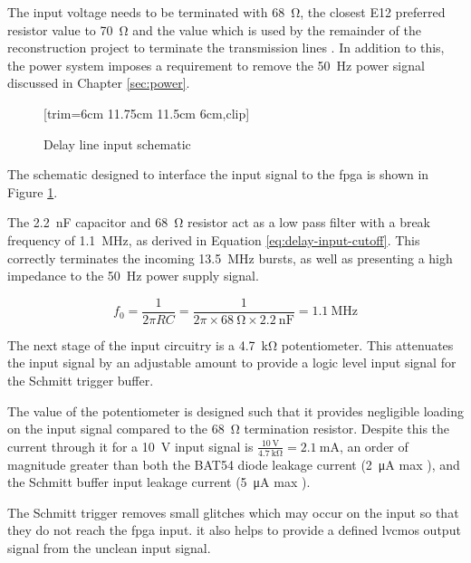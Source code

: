 The input voltage needs to be terminated with \SI{68}{\ohm}, the closest E12 preferred resistor value to \SI{70}{\ohm} and the value which is used by the remainder of the reconstruction project to terminate the transmission lines \cite{burton2014b}. In addition to this, the power system imposes a requirement to remove the \SI{50}{\hertz} power signal discussed in Chapter \ref{sec:power}.

\begin{figure}[ht]
	\centering
	[trim={6cm 11.75cm 11.5cm 6cm},clip] %
	\caption{Delay line input schematic}
	\label{fig:delay-line-input-sch}
\end{figure}

The schematic designed to interface the input signal to the \gls{fpga} is shown in Figure \ref{fig:delay-line-input-sch}.

The \SI{2.2}{\nano\farad} capacitor and \SI{68}{\ohm} resistor act as a low pass filter with a break frequency of \SI{1.1}{\mega\hertz}, as derived in Equation \ref{eq:delay-input-cutoff}. This correctly terminates the incoming \SI{13.5}{\mega\hertz} bursts, as well as presenting a high impedance to the \SI{50}{\hertz} power supply signal.

\begin{equation}
f_0 = \frac{1}{2\pi RC} = \frac{1}{2\pi \times \SI{68}{\ohm} \times \SI{2.2}{\nano\farad}} = \SI{1.1}{\mega\hertz} \label{eq:delay-input-cutoff}
\end{equation}

The next stage of the input circuitry is a \SI{4.7}{\kilo\ohm} potentiometer. This attenuates the input signal by an adjustable amount to provide a logic level input signal for the Schmitt trigger buffer.

The value of the potentiometer is designed such that it provides negligible loading on the input signal compared to the \SI{68}{\ohm} termination resistor. Despite this the current through it for a \SI{10}{\volt} input signal is $\frac{\SI{10}{\volt}}{\SI{4.7}{\kilo\ohm}} = \SI{2.1}{\milli\ampere}$, an order of magnitude greater than both the BAT54 diode leakage current (\SI{2}{\micro\ampere} max \cite[p.2]{vishay2013}), and the Schmitt buffer input leakage current (\SI{5}{\micro\ampere} max \cite[p.4]{diodesinc2014}).

The Schmitt trigger removes small glitches which may occur on the input so that they do not reach the \gls{fpga} input. it also helps to provide a defined \gls{lvcmos} output signal from the unclean input signal.

